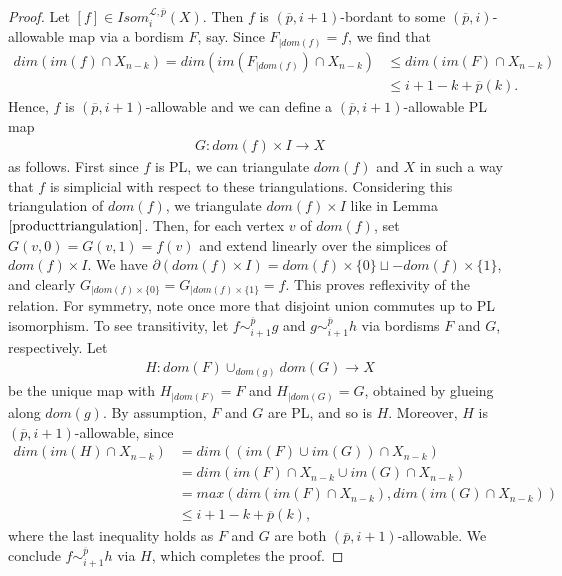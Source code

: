 \documentclass{scrreprt}
\begin{document}
\begin{proof}
Let $[f] \in Isom_i^{\mathcal{L}, \overline{p}}(X)$. Then $f$ is $(\overline{p},i+1)$-bordant to some $(\overline{p},i)$-allowable map via a bordism $F$, say. Since $F_{|dom(f)}=f$, we find that
\begin{align*}
dim(im(f) \cap X_{n-k}) = dim(im(F_{|dom(f)}) \cap X_{n-k}) &\leq dim(im(F) \cap X_{n-k}) \\ &\leq i+1-k+ \overline{p}(k).
\end{align*}
Hence, $f$ is $(\overline{p},i+1)$-allowable and we can define a $(\overline{p},i+1)$-allowable PL map \begin{align*}
G: dom(f) \times I \to X
\end{align*} as follows. First since $f$ is PL, we can triangulate $dom(f)$ and $X$ in such a way that $f$ is simplicial with respect to these triangulations. Considering this triangulation of $dom(f)$, we triangulate $dom(f) \times I$ like in Lemma $\ref{producttriangulation}$. Then, for each vertex $v$ of $dom(f)$, set $G(v,0)=G(v,1)=f(v)$ and extend linearly over the simplices of $dom(f) \times I$. We have $\partial(dom(f) \times I)= dom(f) \times \{ 0 \} \sqcup -dom(f) \times \{  1 \}$, and clearly $G_{|dom(f) \times \{  0 \} }=G_{|dom(f) \times \{  1 \} } = f$. This proves reflexivity of the relation. For symmetry, note once more that disjoint union commutes up to PL isomorphism. To see transitivity, let $f \sim_{i+1}^{\overline{p}} g$ and $g \sim_{i+1}^{\overline{p}} h$ via bordisms $F$ and $G$, respectively. Let
\begin{align*}
H: dom(F) \cup_{dom(g)} dom(G) \to X
\end{align*}
be the unique map with $H_{|dom(F)}=F$ and $H_{|dom(G)}=G$, obtained by glueing along $dom(g)$. By assumption, $F$ and $G$ are PL, and so is $H$. Moreover, $H$ is $(\overline{p},i+1)$-allowable, since
\begin{align*}
dim(im(H) \cap X_{n-k}) &= dim((im(F) \cup im(G)) \cap X_{n-k})\\ & = dim(im(F) \cap X_{n-k} \cup im(G) \cap X_{n-k}) \\ &= max(dim(im(F) \cap X_{n-k}), dim(im(G) \cap X_{n-k})) \\ &\leq i+1-k+ \overline{p}(k),
\end{align*}
where the last inequality holds as $F$ and $G$ are both $(\overline{p},i+1)$-allowable. We conclude $f \sim_{i+1}^{\overline{p}} h$ via $H$, which completes the proof.
\end{proof}
\end{document}
